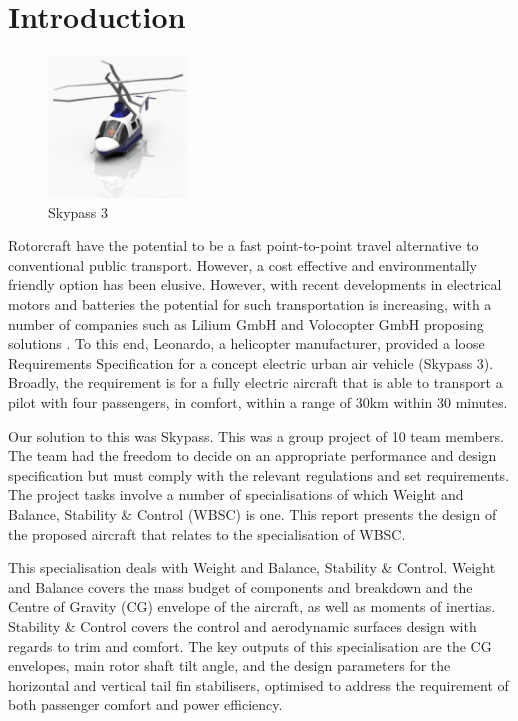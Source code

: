 \documentclass[11pt,a4paper]{article}
\begin{document}
\section{Introduction}
\begin{figure}
\begin{center}
    \includegraphics[width=3.7cm]{photo.PNG}
\end{center}
    \caption{Skypass 3}
    \label{fig:photo}
\end{figure}
Rotorcraft have the potential to be a fast point-to-point travel alternative to conventional public transport. However, a cost effective and environmentally friendly option has been elusive. However, with recent developments in electrical motors and batteries the potential for such transportation is increasing, with a number of companies such as Lilium GmbH and Volocopter GmbH proposing solutions \cite{bbc}. To this end, Leonardo, a helicopter manufacturer, provided a loose Requirements Specification for a concept electric urban air vehicle (Skypass 3). Broadly, the requirement is for a fully electric aircraft that is able to transport a pilot with four passengers, in comfort, within a range of 30km within 30 minutes. 

Our solution to this was Skypass. This was a group project of 10 team members. The team had the freedom to decide on an appropriate performance and design specification but must comply with the relevant regulations and set requirements. The project tasks involve a number of specialisations of which Weight and Balance, Stability \& Control (WBSC) is one. This report presents the design of the proposed aircraft that relates to the specialisation of WBSC.

This specialisation deals with Weight and Balance, Stability \& Control. Weight and Balance covers the mass budget of components and breakdown and the  Centre of Gravity (CG) envelope of the aircraft, as well as moments of inertias. Stability \& Control covers the control and aerodynamic surfaces design with regards to trim and comfort. The key outputs of this specialisation are the CG envelopes, main rotor shaft tilt angle, and the design parameters for the horizontal and vertical tail fin stabilisers, optimised to address the requirement of both passenger comfort and power efficiency.
\end{document}
